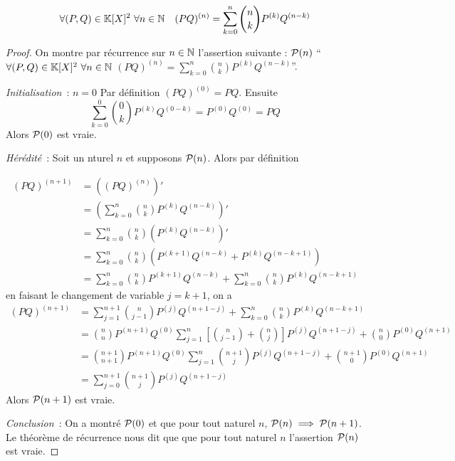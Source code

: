\begin{theo}
  \begin{equation}
    \forall (P,Q) \in \K[X]^2 \ \forall n \in \N \quad (PQ)^{(n)} = \sum_{k = 0}^n
    \binom{n}{k} P^{(k)}Q^{(n-k)}
  \end{equation}
\end{theo}
\begin{proof}
  On montre par récurrence sur \(n \in \N\) l'assertion suivante : \(\P(n)\)
  ``\(\forall (P,Q) \in \K[X]^2 \ \forall n \in \N\) \((PQ)^{(n)} = \sum_{k = 0}^n
  \binom{n}{k} P^{(k)}Q^{(n-k)}\)''.

  \emph{Initialisation}~: \(n = 0\) Par définition \((PQ)^{(0)} = PQ\). Ensuite
  \begin{equation}
    \sum_{k = 0}^0 \binom{0}{k} P^{(k)}Q^{(0-k)} = P^{(0)} Q^{(0)} = PQ
  \end{equation}
  Alors \(\P(0)\) est  vraie.

  \emph{Hérédité}~: Soit un nturel \(n\) et supposons \(\P(n)\). Alors par
  définition

  \begin{align}
    (PQ)^{(n+1)} &= \left((PQ)^{(n)}\right)' \\
    & = \left(\sum_{k = 0}^n \binom{n}{k} P^{(k)}Q^{(n-k)}\right)'\\
    & = \sum_{k = 0}^n \binom{n}{k} (P^{(k)}Q^{(n-k)})'\\
    & = \sum_{k = 0}^n \binom{n}{k} (P^{(k+1)}Q^{(n-k)} + P^{(k)} Q^{(n-k+1)})\\
    & = \sum_{k = 0}^n \binom{n}{k} P^{(k+1)}Q^{(n-k)} + \sum_{k = 0}^n \binom{n}{k}
    P^{(k)} Q^{(n-k+1)}
  \end{align}
  en faisant le changement de variable \(j = k+1\), on a
  \begin{align}
    (PQ)^{(n+1)} & = \sum_{j = 1}^{n+1} \binom{n}{j-1} P^{(j)}Q^{(n+1-j)} +
    \sum_{k = 0}^n \binom{n}{k} P^{(k)} Q^{(n-k+1)}\\
    & = \binom{n}{n} P^{(n+1)}Q^{(0)} \sum_{j = 1}^{n} \left[\binom{n}{j-1} +
    \binom{n}{j} \right] P^{(j)}Q^{(n+1-j)} + \binom{n}{0} P^{(0)}Q^{(n+1)} \\
    & = \binom{n+1}{n+1} P^{(n+1)}Q^{(0)} \sum_{j = 1}^{n} \binom{n+1}{j}
    P^{(j)}Q^{(n+1-j)} + \binom{n+1}{0} P^{(0)}Q^{(n+1)} \\
    & = \sum_{j = 0}^{n+1} \binom{n+1}{j} P^{(j)}Q^{(n+1-j)}
  \end{align}
  Alors \(\P(n+1)\) est vraie.

  \emph{Conclusion}~: On a montré \(\P(0)\) et que pour tout naturel \(n\),
  \(\P(n) \implies \P(n+1)\). Le théorème de récurrence nous dit que que pour
  tout naturel \(n\) l'assertion \(\P(n)\) est vraie.
\end{proof}

